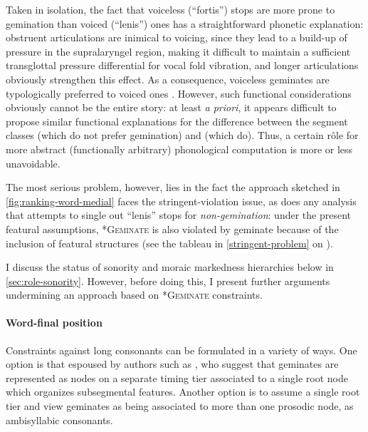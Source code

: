 Taken in isolation, the fact that voiceless (\enquote{fortis}) stops are more prone to gemination than voiced (\enquote{lenis}) ones has a straightforward phonetic explanation: obstruent articulations are inimical to voicing, since they lead to a build-up of pressure in the supralaryngel region, making it difficult to maintain a sufficient transglottal pressure differential for vocal fold vibration, and longer articulations obviously strengthen this effect. As a consequence, voiceless geminates are typologically preferred to voiced ones \citep[\egm][]{hirose07,ohala:_turbul}. However, such functional considerations obviously cannot be the entire story: at least \emph{a priori}, it appears difficult to propose similar functional explanations for the difference between the segment classes \ipa{[f~θ~χ]} (which do not prefer gemination) and \ipa{[s~ʃ~ɬ]} (which do). Thus, a certain rôle for more abstract (\ie functionally arbitrary) phonological computation is more or less unavoidable.

The most serious problem, however, lies in the fact the approach sketched in \cref{fig:ranking-word-medial} faces the stringent\hyp violation issue, as does any analysis that attempts to single out \enquote{lenis} stops for \emph{non\hyp gemination}: under the present featural assumptions, \textsc{*Geminate}\ipa{[b~d~ɡ]} is also violated by geminate \ipa{[p~t~k]} because of the inclusion of featural structures (see the tableau in \ref{stringent-problem} on ).

I discuss the status of sonority and  moraic markedness hierarchies below in \cref{sec:role-sonority}. However, before doing this, I present further arguments undermining an approach based on \textsc{*Geminate} constraints.

\paragraph{Word-final position}
\label{sec:word-final-position}

Constraints against long consonants can be formulated in a variety of ways. One option is that espoused by authors such as \citet{selkirk90,ringen11:_gemin}, who suggest that geminates are represented as nodes on a separate timing tier associated to a single root node which organizes subsegmental features. Another option is to assume a single root tier and view geminates as being associated to more than one prosodic node, \ie as ambisyllabic consonants.

